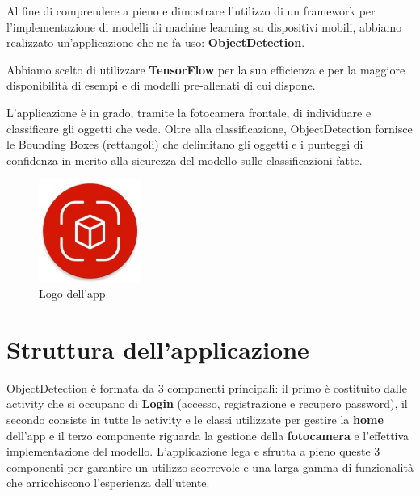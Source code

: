 Al fine di comprendere a pieno e dimostrare l’utilizzo di un framework per l’implementazione di modelli di machine learning su dispositivi mobili, abbiamo
realizzato un’applicazione che ne fa uso: \textbf{ObjectDetection}.

Abbiamo scelto di utilizzare \textbf{TensorFlow} per la sua efficienza e per la maggiore disponibilità di esempi e di modelli pre-allenati di cui dispone.

L’applicazione è in grado, tramite la fotocamera frontale, di individuare e classificare gli oggetti che vede. Oltre alla classificazione, ObjectDetection
fornisce le Bounding Boxes (rettangoli) che delimitano gli oggetti e i punteggi di confidenza in merito alla sicurezza del modello sulle classificazioni fatte.
\begin{figure}
    \centering
    \includegraphics[width=0.3\textwidth]{Immagini/App/icona_app.jpg}
    \caption{Logo dell’app}
\end{figure}

\newpage
\section{Struttura dell'applicazione}
ObjectDetection è formata da 3 componenti principali: il primo è costituito dalle activity che si occupano di \textbf{Login} (accesso, registrazione e recupero
password), il secondo consiste in tutte le activity e le classi utilizzate per gestire la \textbf{home} dell’app e il terzo componente riguarda la gestione della
\textbf{fotocamera} e l’effettiva implementazione del modello.
L’applicazione lega e sfrutta a pieno queste 3 componenti per garantire un utilizzo scorrevole e una larga gamma di funzionalità che arricchiscono
l’esperienza dell’utente.

